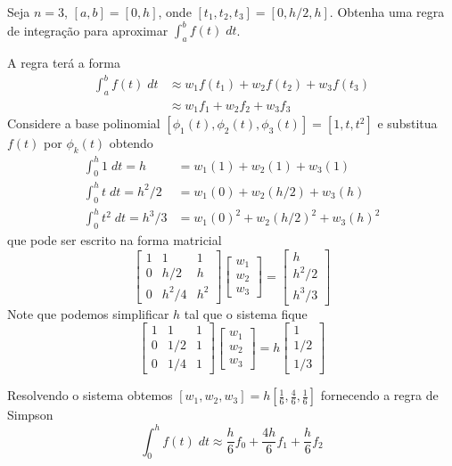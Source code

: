\begin{ex}
Seja $n=3$, $[a,b]=[0,h]$, onde $[t_1,t_2,t_3]=[0,h/2,h]$. Obtenha uma regra de integração para aproximar $\int _a^b f(t)\;dt$.
\end{ex}
\begin{sol}
A regra terá a forma
\begin{align}
  \int _a^b f(t)\;dt & \approx w_1f(t_1)+w_2f(t_2)+w_3f(t_3)\\
                 & \approx w_1f_1   +w_2f_2   +w_3f_3
\end{align}
Considere a base polinomial $[\phi _1(t),\phi _2(t),\phi _3(t)]=[1,t,t^2]$ e substitua $f(t)$ por $\phi_k(t)$ obtendo
\begin{align}
   \int _0^h 1   \;dt = h     &=  w_1(1)   +w_2(1)     + w_3(1) \\
   \int _0^h t   \;dt = h^2/2 &=  w_1(0)   +w_2(h/2)   + w_3(h) \\
   \int _0^h t^2 \;dt = h^3/3 &=  w_1(0)^2 +w_2(h/2)^2 + w_3(h)^2
\end{align}
que pode ser escrito na forma matricial
\begin{equation}
\begin{bmatrix}
    1  &  1    &  1 \\
    0  &  h/2    & h  \\
    0  &  h^2/4    & h^2
\end{bmatrix}
\begin{bmatrix}
 w_1 \\ w_2\\ w_3
\end{bmatrix}
=
\begin{bmatrix}
 h  \\ h^2/2 \\ h^3/3
\end{bmatrix}
\end{equation}
Note que podemos simplificar $h$ tal que o sistema fique
\begin{equation}
\begin{bmatrix}
    1  &  1    &  1 \\
    0  &  1/2  & 1  \\
    0  &  1/4  & 1
\end{bmatrix}
\begin{bmatrix}
 w_1 \\ w_2\\ w_3
\end{bmatrix}
=
h
\begin{bmatrix}
 1  \\ 1/2 \\ 1/3
\end{bmatrix}
\end{equation}

Resolvendo o sistema obtemos $\displaystyle [w_1,w_2,w_3]=h[\frac{1}{6},\frac{4}{6},\frac{1}{6}]$ fornecendo a regra de Simpson
\begin{equation}
  \int _0^h f(t) \;dt \approx  \frac{h}{6}f_0+\frac{4h}{6}f_1+\frac{h}{6}f_2
\end{equation}
\end{sol}

